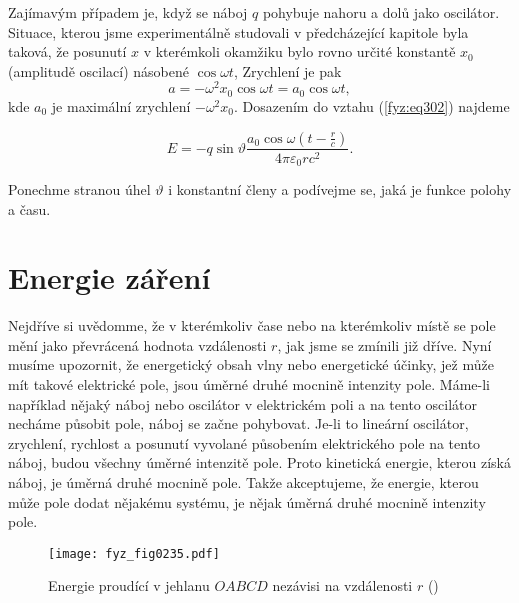     Zajímavým případem je, když se náboj \(q\) pohybuje nahoru a dolů jako oscilátor. Situace, 
    kterou jsme experimentálně studovali v předcházející kapitole byla taková, že posunutí \(x\) v 
    kterémkoli okamžiku bylo rovno určité konstantě \(x_0\) (amplitudě oscilací) násobené \(\cos 
    \omega t\), Zrychlení je pak
    \begin{equation}\label{fyz:eq303}
      a = -\omega^2x_0\cos\omega t = a_0\cos\omega t,
    \end{equation}
    kde \(a_0\) je maximální zrychlení \(-\omega^2x_0\). Dosazením do vztahu (\ref{fyz:eq302}) 
    najdeme

    \begin{equation}\label{fyz:eq304}
      E = -q\sin\vartheta\frac{a_0\cos\omega\left(t-\frac{r}{c}\right)}{4\pi\varepsilon_0rc^2}.
    \end{equation}
    
    Ponechme stranou úhel \(\vartheta\) i konstantní členy a podívejme se, jaká je funkce polohy a 
    času.
    
  \section{Energie záření}\label{fyz:IchapXXIXsecII}
    Nejdříve si uvědomme, že v kterémkoliv čase nebo na kterémkoliv místě se pole mění jako 
    převrácená hodnota vzdálenosti \(r\), jak jsme se zmínili již dříve. Nyní musíme upozornit, že 
    energetický obsah vlny nebo energetické účinky, jež může mít takové elektrické pole, jsou 
    úměrné druhé mocnině intenzity pole. Máme-li například nějaký náboj nebo oscilátor v 
    elektrickém poli a na tento oscilátor necháme působit pole, náboj se začne pohybovat. Je-li to 
    lineární oscilátor, zrychlení, rychlost a posunutí vyvolané působením elektrického pole na 
    tento náboj, budou všechny úměrné intenzitě pole. Proto kinetická energie, kterou získá náboj, 
    je úměrná druhé mocnině pole. Takže akceptujeme, že energie, kterou může pole dodat nějakému 
    systému, je nějak úměrná druhé mocnině intenzity pole.

    \begin{figure}[ht!] %
      \centering
      \texttt{[image: fyz\_fig0235.pdf]}
      \caption{Energie proudící v jehlanu \(OABCD\) nezávisi na vzdálenosti \(r\)
               (\cite[s.~381]{Feynman01})}
      \label{fyz:fig0235}
    \end{figure}
    
